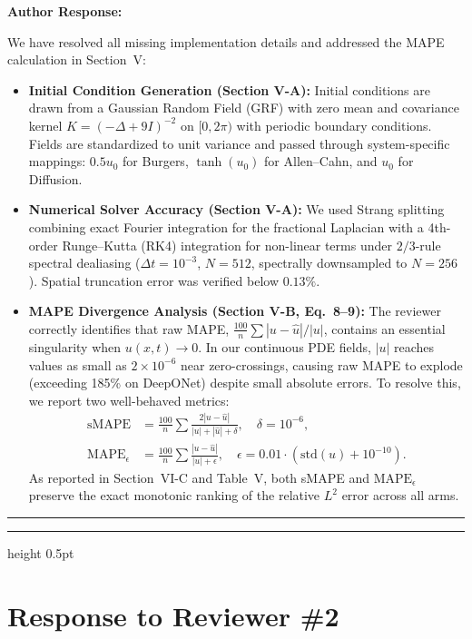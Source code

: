 \documentclass[11pt,a4paper]{article}
\newenvironment{authorresponse}{%
  \vspace{1mm}\par\noindent
  \textbf{\color{navyblue}Author Response:}\par\vspace{1.5mm}
}{%
  \vspace{3mm}\par\noindent\rule{\textwidth}{0.3pt}\vspace{2mm}
}
\begin{document}
\begin{authorresponse}
We have resolved all missing implementation details and addressed the MAPE calculation in Section~V:
\begin{itemize}
  \item \textbf{Initial Condition Generation (Section V-A):} Initial conditions are drawn from a Gaussian Random Field (GRF) with zero mean and covariance kernel $K = (-\Delta + 9I)^{-2}$ on $[0, 2\pi)$ with periodic boundary conditions. Fields are standardized to unit variance and passed through system-specific mappings: $0.5 u_0$ for Burgers, $\tanh(u_0)$ for Allen--Cahn, and $u_0$ for Diffusion.
  \item \textbf{Numerical Solver Accuracy (Section V-A):} We used Strang splitting combining exact Fourier integration for the fractional Laplacian with a 4th-order Runge--Kutta (RK4) integration for non-linear terms under $2/3$-rule spectral dealiasing ($\Delta t = 10^{-3}$, $N=512$, spectrally downsampled to $N=256$). Spatial truncation error was verified below $0.13\%$.
  \item \textbf{MAPE Divergence Analysis (Section V-B, Eq.~8--9):} The reviewer correctly identifies that raw MAPE, $\frac{100}{n}\sum |u - \hat{u}|/|u|$, contains an essential singularity when $u(x, t) \to 0$. In our continuous PDE fields, $|u|$ reaches values as small as $2 \times 10^{-6}$ near zero-crossings, causing raw MAPE to explode (exceeding 185\% on DeepONet) despite small absolute errors. To resolve this, we report two well-behaved metrics:
  \begin{align}
    \text{sMAPE} &= \frac{100}{n}\sum \frac{2|u - \hat{u}|}{|u| + |\hat{u}| + \delta}, \quad \delta = 10^{-6},\\
    \text{MAPE}_\epsilon &= \frac{100}{n}\sum \frac{|u - \hat{u}|}{|u| + \epsilon}, \quad \epsilon = 0.01\cdot(\text{std}(u) + 10^{-10}).
  \end{align}
  As reported in Section~VI-C and Table~V, both sMAPE and $\text{MAPE}_\epsilon$ preserve the exact monotonic ranking of the relative $L^2$ error across all arms.
\end{itemize}
\end{authorresponse}

\vspace{3mm}
\hrule height 0.5pt
\vspace{3mm}

\section*{Response to Reviewer \#2}
\end{document}
